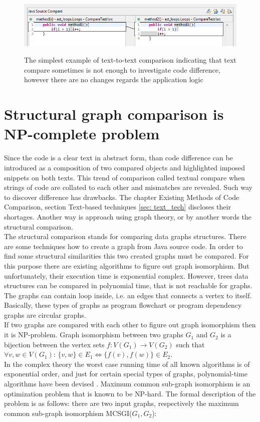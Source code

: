 \documentclass{report}
\begin{document}
\begin{figure}[h]
  \centering
  \includegraphics[scale=0.6]{Figures/introduction/intro-code-example}\\[0.1cm]
  \caption[Text to text comparison example]{The simplest example of text-to-text comparison indicating that text compare sometimes is not enough to investigate code difference, however there are no changes regards the application logic}
  \label{fig:intro-code-example}
\end{figure}

\section{Structural graph comparison is NP-complete problem}

Since the code is a clear text in abstract form, than code difference can be introduced as a composition of two compared objects and highlighted imposed snippets on both texts. This trend of comparison called textual compare when strings of code are collated to each other and mismatches are revealed. Such way to discover difference has drawbacks. The chapter Existing Methods of Code Comparison, section Text-based techniques \ref{sec: text_tech} discloses their shortages. Another way is approach using graph theory, or by another words the structural comparison.
\\
The structural comparison stands for comparing data graphs structures. There are some techniques how to create a graph from Java source code. In order to find some structural similarities this two created graphs must be compared. For this purpose there are existing algorithms to figure out graph isomorphism. But unfortunately, their execution time is exponential complex. However, trees data structures can be compared in polynomial time, that is not reachable for graphs. The graphs can contain loop inside, i.e. an edges that connects a vertex to itself. Basically, these types of graphs as program flowchart or program dependency graphs are circular graphs. 
\\
If two graphs are compared with each other to figure out graph isomorphism then it is NP-problem. Graph isomorphism between two graphs $G_{1}$ and $G_{2}$ is a bijection between the vertex sets $f: V(G_{1}) \rightarrow V(G_{2}) $ such that \\ $ \forall v, w \in V(G_{1})$:  $ \{v,w\} \in E_{1} \iff \{ f(v), f(w)\} \in E_{2}$. 
\\
In the complex theory the worst case running time of all known algorithms is of exponential order, and just for certain special types of graphs, polynomial-time algorithms have been devised \cite{graph_isomorphism_is}. Maximum common sub-graph isomorphism is an optimization problem that is known to be NP-hard. The formal description of the problem is as follows:
there are two input graphs, respectively the maximum common sub-graph isomorphism MCSGI($ G_{1}, G_{2}$):
\end{document}
